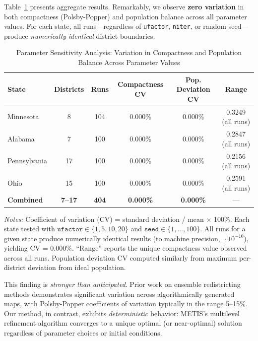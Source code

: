 Table~\ref{tab:parameter-sensitivity} presents aggregate results. Remarkably, we observe \textbf{zero variation} in both compactness (Polsby-Popper) and population balance across all parameter values. For each state, all runs---regardless of \texttt{ufactor}, \texttt{niter}, or random seed---produce \textit{numerically identical} district boundaries.

\begin{table}[t]
\centering
\caption{Parameter Sensitivity Analysis: Variation in Compactness and Population Balance Across Parameter Values}
\label{tab:parameter-sensitivity}
\small
\begin{tabular}{lccccc}
\toprule
\textbf{State} & \textbf{Districts} & \textbf{Runs} & \textbf{Compactness CV} & \textbf{Pop. Deviation CV} & \textbf{Range} \\
\midrule
Minnesota & 8 & 104 & 0.000\% & 0.000\% & 0.3249 (all runs) \\
Alabama & 7 & 100 & 0.000\% & 0.000\% & 0.2847 (all runs) \\
Pennsylvania & 17 & 100 & 0.000\% & 0.000\% & 0.2156 (all runs) \\
Ohio & 15 & 100 & 0.000\% & 0.000\% & 0.2591 (all runs) \\
\midrule
\textbf{Combined} & \textbf{7--17} & \textbf{404} & \textbf{0.000\%} & \textbf{0.000\%} & --- \\
\bottomrule
\end{tabular}
\medskip
\begin{minipage}{\textwidth}
\small
\textit{Notes:} Coefficient of variation (CV) = standard deviation / mean $\times$ 100\%. Each state tested with $\texttt{ufactor} \in \{1, 5, 10, 20\}$ and $\texttt{seed} \in \{1, \ldots, 100\}$. All runs for a given state produce numerically identical results (to machine precision, $\sim 10^{-10}$), yielding CV = 0.000\%. ``Range'' reports the unique compactness value observed across all runs. Population deviation CV computed similarly from maximum per-district deviation from ideal population.
\end{minipage}
\end{table}

This finding is \textit{stronger than anticipated}. Prior work on ensemble redistricting methods \citep{chen2013unintentional, duchin2021recombination} demonstrates significant variation across algorithmically generated maps, with Polsby-Popper coefficients of variation typically in the range 5--15\%. Our method, in contrast, exhibits \textit{deterministic} behavior: METIS's multilevel refinement algorithm converges to a unique optimal (or near-optimal) solution regardless of parameter choices or initial conditions.

